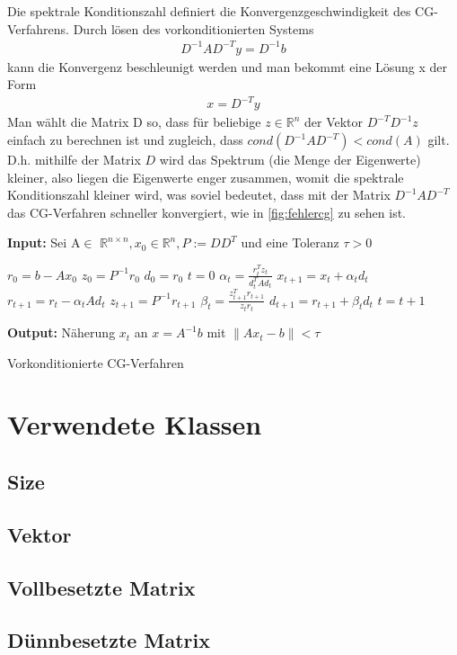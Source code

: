 \documentclass[12pt,a4paper]{scrartcl}
\numberwithin{equation}{section}
\numberwithin{myalgctr}{section}
\numberwithin{mytheoremctr}{subsection}
\numberwithin{mykorollarctr}{subsection}
\numberwithin{mylemmactr}{subsection}
\numberwithin{mybeispielctr}{subsection}
\newcommand\norm[1]{\left\lVert#1\right\rVert}
\begin{document}
	
	Die spektrale Konditionszahl definiert die Konvergenzgeschwindigkeit des CG-Verfahrens. Durch lösen des vorkonditionierten Systems
	\begin{align*}
		D^{-1}AD^{-T}y = D^{-1}b
	\end{align*}
	kann die Konvergenz beschleunigt werden und man bekommt eine Lösung x der Form 
	\begin{align*}
		x = D^{-T}y
	\end{align*}
	Man wählt die Matrix D so, dass für beliebige $z \in \mathbb{R}^{n}$ der Vektor $D^{-T}D^{-1}z$ einfach zu berechnen ist und zugleich, dass $cond(D^{-1}AD^{-T}) < cond(A)$ gilt. D.h. mithilfe der Matrix $D$ wird das Spektrum (die Menge der Eigenwerte) kleiner, also liegen die Eigenwerte enger zusammen, womit die spektrale Konditionszahl kleiner wird, was soviel bedeutet, dass mit der Matrix $D^{-1}AD^{-T}$ das CG-Verfahren schneller konvergiert, wie in \cref{fig:fehlercg} zu sehen ist. 
	\begin{algorithm}[H]
		\textbf{Input:} Sei A$\in$ $\mathbb{R}^{n\times n}, x_0 \in \mathbb{R}^{n}, P:=DD^{T}$ und eine Toleranz $\tau > 0$
		\begin{algorithmic}[1]
			\State $r_0 = b - Ax_0$
			\State $z_0 = P^{-1}r_0$
			\State $d_0 = r_0$
			\State $t = 0$
			\While{$ \norm{r_t} > \tau $}
			\State $\alpha_t = \frac{r_t^{T}z_t}{d_t^{T}Ad_t}$
			\State $x_{t+1} = x_{t} + \alpha_t d_t$
			\State $r_{t+1} = r_t - \alpha_t Ad_t$
			\State $z_{t+1} = P^{-1}r_{t+1}$
			\State $\beta_t = \frac{z_{t+1}^{T}r_{t+1}}{z_tr_t}$
			\State $d_{t+1} = r_{t+1} + \beta_td_t$
			\State $t = t + 1$
			\EndWhile
		\end{algorithmic}
		\textbf{Output:} Näherung $x_t$ an $x = A^{-1}b$ mit $\norm{Ax_t-b} < \tau$
		
		\caption{Vorkonditionierte CG-Verfahren} \label{alg:vcg}
	\end{algorithm}
	
	\newpage
	\appendix
	\section{Verwendete Klassen}
	\subsection{Size}
	
	\subsection{Vektor}
	
	\subsection{Vollbesetzte Matrix}
	
	\subsection{D\"unnbesetzte Matrix}
	
	
	\newpage
	\printbibliography
	\listoffigures
	\thispagestyle{firststyle}
	
\end{document}
